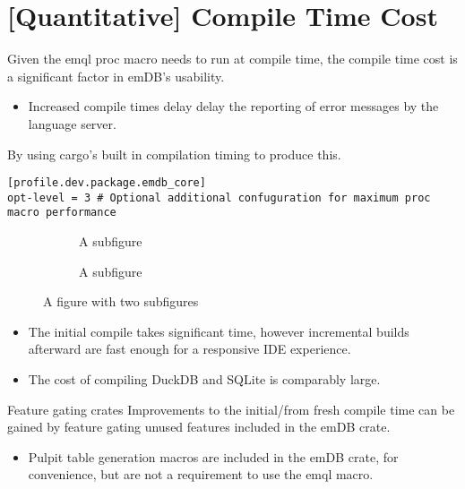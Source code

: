 \section{[Quantitative] Compile Time Cost}
Given the emql proc macro needs to run at compile time, the compile time cost is a significant factor in emDB's usability.
\begin{itemize}
    \setlength\itemsep{0em}
    \item Increased compile times delay delay the reporting of error messages by the language server.
\end{itemize}
By using cargo's built in compilation timing to produce this.
\begin{verbatim}
[profile.dev.package.emdb_core]
opt-level = 3 # Optional additional confuguration for maximum proc macro performance
\end{verbatim}
\noindent
\begin{figure}
    \centering
    \begin{subfigure}
      \centering
      \caption{A subfigure}
      \label{fig:sub1}
    \end{subfigure}%
    \begin{subfigure}
      \centering
      \caption{A subfigure}
      \label{fig:sub2}
    \end{subfigure}
    \caption{A figure with two subfigures}
    \label{fig:test}
\end{figure}
\begin{itemize}
    \setlength\itemsep{0em}
    \item The initial compile takes significant time, however incremental builds afterward are fast enough for a responsive IDE experience.
    \item The cost of compiling DuckDB and SQLite is comparably large.
\end{itemize}
\begin{futurebox}{Feature gating crates}
    Improvements to the initial/from fresh compile time can be gained by feature gating unused features included in the emDB crate.
    \begin{itemize}
        \item Pulpit table generation macros are included in the emDB crate, for convenience, but are not a requirement to use the emql macro.
    \end{itemize}
\end{futurebox}
